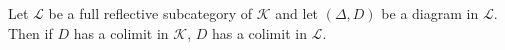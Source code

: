 Let $\mathcal{L}$ be a full reflective subcategory of $\mathcal{K}$ and let $(\Delta, D)$ be a diagram in $\mathcal{L}$. Then if $D$ has a colimit in $\mathcal{K}$, $D$ has a colimit in $\mathcal{L}$.
